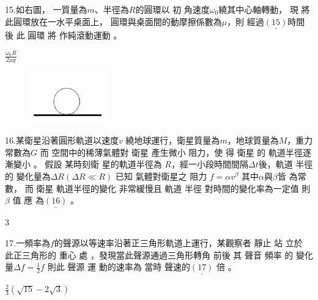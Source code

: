 \documentclass[cn,10pt,math=newtx]{elegantbook}
\begin{document}
\newpage


\begin{example}
   15.如右圖， 一質量為$m$、半徑為$R$的圓環以 初 角速度$\omega_0$繞其中心軸轉動，
現 將此圓環放在一水平桌面上， 圓環與桌面間的動摩擦係數為$\mu$，則
經過$\underline{(15)}$時間 後 此 圓環 將 作純滾動運動 。\\
    \rightline{[文華高中教甄109]}
\end{example}
\begin{solution}
    $\frac{\omega_0 R}{2\mu g}$
\end{solution}
\begin{figure}[htbp]
    \flushright
    \includegraphics[width=0.3\textwidth]{image/109文華15.png}
  \end{figure}
\newpage


\begin{example}
   16.某衛星沿著圓形軌道以速度$v$ 繞地球運行，衛星質量為$m$，地球質量為$M$，重力常數為$G$
而 空間中的稀薄氣體對 衛星 產生微小 阻力，使 得 衛星 的 軌道半徑逐漸變小 。 假設 某時刻衛
星的軌道半徑為 $R$，經一小段時間間隔$\Delta t$後，軌道 半徑的 變化量為$\Delta R (\Delta R \ll R)$ 已知 氣體對衛星之 阻力 $f=\alpha v^\beta$ 其中$\alpha$與$\beta$皆 為常數， 而 衛星 軌道半徑的變化 非常緩慢且 軌道
半徑 對時間的變化率為一定值 則$\beta$ 值 應 為$\underline{(16)}$ 。\\
    \rightline{[文華高中教甄109]}
\end{example}
\begin{solution}
    $3$
\end{solution}

\newpage


\begin{example}
   17.一頻率為$f$的聲源以等速率沿著正三角形軌道上運行，某觀察者 靜止 站 立於 此正三角形的
重心 處 ，發現當此聲源通過三角形轉角 前後 其 聲音 頻率 的 變化量$\Delta f= \frac{1}{2}f$ 則此 聲源 運 動的速率為 當時 聲速的$\underline{(17)}$ 倍 。\\
    \rightline{[文華高中教甄109]}
\end{example}
\begin{solution}
    $\frac{2}{3}(\sqrt{15}-2\sqrt{3})$
\end{solution}
\end{document}
